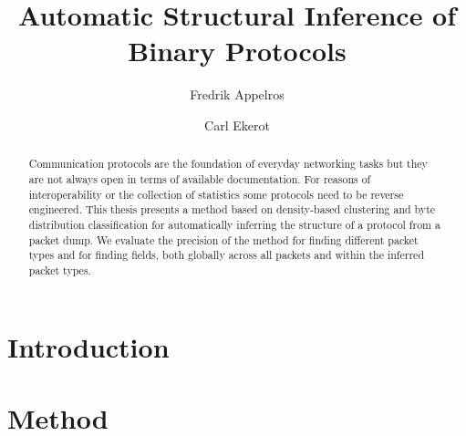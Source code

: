 \documentclass[a4paper]{article}
\begin{document}
\title{Automatic Structural Inference of Binary Protocols}
\author{Fredrik Appelros \and Carl Ekerot}

\begin{abstract}
Communication protocols are the foundation of everyday networking tasks but
they are not always open in terms of available documentation. For reasons of
interoperability or the collection of statistics some protocols need to be
reverse engineered. This thesis presents a method based on density-based
clustering and byte distribution classification for automatically inferring the
structure of a protocol from a packet dump. We evaluate the precision of the
method for finding different packet types and for finding fields, both globally
across all packets and within the inferred packet types.
\end{abstract}

\section{Introduction}
\section{Method}
\end{document}
